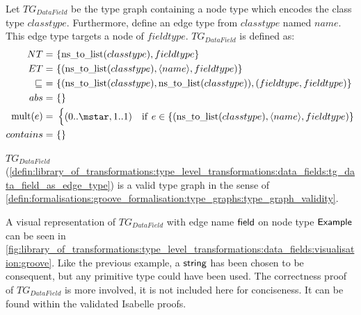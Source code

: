 \begin{defin}
\label{defin:library_of_transformations:type_level_transformations:data_fields:tg_data_field_as_edge_type}
Let $TG_{DataField}$ be the type graph containing a node type which encodes the class type $classtype$. Furthermore, define an edge type from $classtype$ named $name$. This edge type targets a node of $fieldtype$. $TG_{DataField}$ is defined as:
\begin{align*}
NT =\ &\{\mathrm{ns\_\!to\_\!list}(classtype), fieldtype\} \\
ET =\ &\{(\mathrm{ns\_\!to\_\!list}(classtype), \langle name \rangle, fieldtype)\} \\
\!\!\sqsubseteq\ =\ &\{( \mathrm{ns\_\!to\_\!list}(classtype), \mathrm{ns\_\!to\_\!list}(classtype) ), ( fieldtype, fieldtype )\} \\
abs =\ &\{\} \\
\mathrm{mult}(e) =\ &\begin{cases}
    (0..\mstar, 1..1) &\mathrm{if}\ e \in \{(\mathrm{ns\_\!to\_\!list}(classtype), \langle name \rangle, fieldtype)\}
\end{cases} \\
contains =\ &\{\}
\end{align*}
\end{defin}

\begin{thm}
\label{defin:library_of_transformations:type_level_transformations:data_fields:tg_data_field_as_edge_type_correct}
$TG_{DataField}$ (\cref{defin:library_of_transformations:type_level_transformations:data_fields:tg_data_field_as_edge_type}) is a valid type graph in the sense of \cref{defin:formalisations:groove_formalisation:type_graphs:type_graph_validity}.
\end{thm}

A visual representation of $TG_{DataField}$ with edge name $\mathsf{field}$ on node type $\mathsf{Example}$ can be seen in \cref{fig:library_of_transformations:type_level_transformations:data_fields:visualisation:groove}. Like the previous example, a $\mathsf{string}$ has been chosen to be consequent, but any primitive type could have been used. The correctness proof of $TG_{DataField}$ is more involved, it is not included here for conciseness. It can be found within the validated Isabelle proofs.

